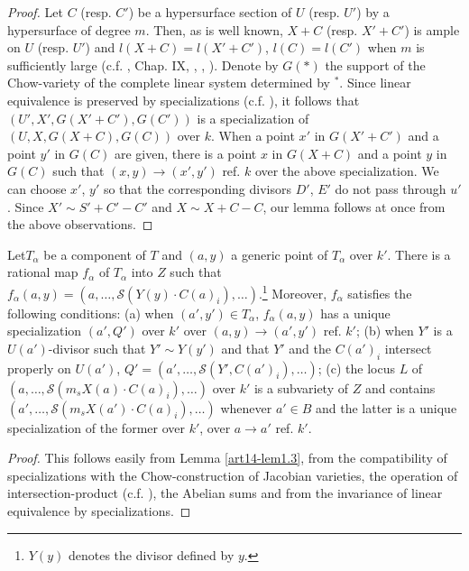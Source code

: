 \begin{proof}
Let $C$ (resp. $C'$) be a hypersurface section of $U$ (resp. $U'$) by a hypersurface of degree $m$. Then, as is well known, $X+C$ (resp. $X'+C'$) is ample on $U$ (resp. $U'$) and $l(X+C)=l(X'+C')$, $l(C)=l(C')$ when $m$ is sufficiently large (c.f. \cite{art14-key25}, Chap. IX, \cite{art14-key31}, \cite{art14-key21}, \cite{art14-key4}). Denote by $G(*)$ the support of the Chow-variety of the complete linear system determined by $^{*}$. Since linear equivalence is preserved by specializations (c.f. \cite{art14-key24}), it follows that $(U',X',G(X'+C'),G(C'))$ is a specialization of $(U,X,G(X+C),G(C))$ over $k$. When a point $x'$ in $G(X'+C')$ and a point $y'$ in $G(C)$ are given, there is a point $x$ in $G(X+C)$ and a point $y$ in $G(C)$ such that $(x,y)\to (x',y')$ ref. $k$ over the above specialization. We can choose $x'$, $y'$ so that the corresponding divisors $D'$, $E'$ do not pass through $u'$. Since $X'\sim S'+C'-C'$ and $X\sim X+C-C$, our lemma follows at once from the above observations. 
\end{proof}

\begin{coro*}
Let\pageoriginale $T_{\alpha}$ be a component of $T$ and $(a,y)$ a generic point of $T_{\alpha}$ over $k'$. There is a rational map $f_{\alpha}$ of $T_{\alpha}$ into $Z$ such that $f_{\alpha}(a,y)=(a,\ldots,\mathscr{S}(Y(y)\cdot C(a)_{i}),\ldots)$.\footnote{$Y(y)$ denotes the divisor defined by $y$.} Moreover, $f_{\alpha}$ satisfies the following conditions: {\rm(a)} when $(a',y')\in T_{\alpha}$, $f_{\alpha}(a,y)$ has a unique specialization $(a',Q')$ over $k'$ over $(a,y)\to (a',y')$ ref. $k'$; {\rm(b)} when $Y'$ is a $U(a')$-divisor such that $Y'\sim Y(y')$ and that $Y'$ and the $C(a')_{i}$ intersect properly on $U(a')$, $Q'=(a',\ldots,\mathscr{S}(Y',C(a')_{i}),\ldots)$; {\rm(c)} the locus $L$ of $(a,\ldots,\mathscr{S}(m_{s}X(a)\cdot C(a)_{i}),\ldots)$ over $k'$ is a subvariety of $Z$ and contains $(a',\ldots,\mathscr{S}(m_{s}X(a')\cdot C(a)_{i}),\ldots)$ whenever $a'\in B$ and the latter is a unique specialization of the former over $k'$, over $a\to a'$ {\rm ref.} $k'$.
\end{coro*}

\begin{proof}
This follows easily from Lemma \ref{art14-lem1.3}, from the compatibility of specializations with the Chow-construction of Jacobian varieties, the operation of intersection-product (c.f. \cite{art14-key24}), the Abelian sums and from the invariance of linear equivalence by specializations.
\end{proof}

